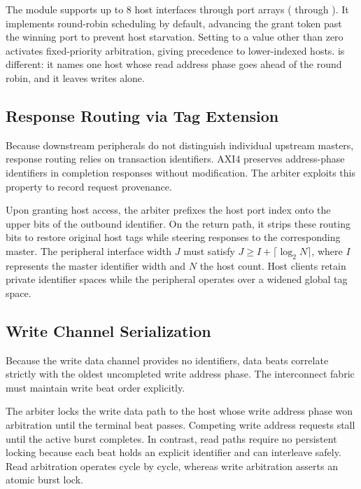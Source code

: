 \documentclass[journal,9pt]{IEEEtran}
\begin{document}
The module  supports up to 8 host interfaces through port
arrays ( through ). It implements round-robin
scheduling by default, advancing the grant token past the winning port to
prevent host starvation. Setting  to a value other than zero
activates fixed-priority arbitration, giving precedence to lower-indexed
hosts.  is different: it names one host whose read address
phase goes ahead of the round robin, and it leaves writes alone.

\subsection{Response Routing via Tag Extension}

Because downstream peripherals do not distinguish individual upstream
masters, response routing relies on transaction identifiers. AXI4 preserves
address-phase identifiers in completion responses without modification. The
arbiter exploits this property to record request provenance.

Upon granting host access, the arbiter prefixes the host port index onto the
upper bits of the outbound identifier. On the return path, it strips these
routing bits to restore original host tags while steering responses to the
corresponding master. The peripheral interface width \(J\) must satisfy
\(J \ge I + \lceil\log_2 N\rceil\), where \(I\) represents the master
identifier width and \(N\) the host count. Host clients retain private
identifier spaces while the peripheral operates over a widened global tag
space.

\subsection{Write Channel Serialization}

Because the write data channel provides no identifiers, data beats correlate
strictly with the oldest uncompleted write address phase. The interconnect
fabric must maintain write beat order explicitly.

The arbiter locks the write data path to the host whose write address phase
won arbitration until the terminal beat passes. Competing write address
requests stall until the active burst completes. In contrast, read paths
require no persistent locking because each beat holds an explicit identifier
and can interleave safely. Read arbitration operates cycle by cycle, whereas
write arbitration asserts an atomic burst lock.
\end{document}
